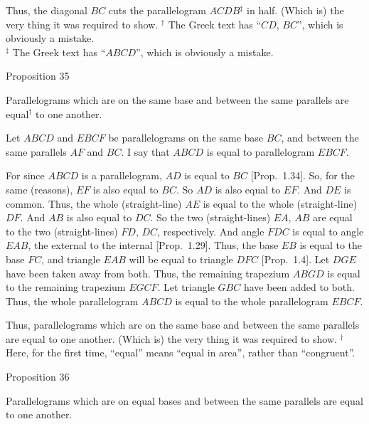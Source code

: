 Thus, the diagonal $BC$ cuts the parallelogram $ACDB$$^\ddag$ in half. (Which is) the
very thing it was required to show.
{\footnotesize \noindent$^\dag$ The Greek text has ``$CD$, $BC$'',
which is obviously a mistake.\\
$^\ddag$ The Greek
text has ``$ABCD$'', which is obviously a mistake.}


\begin{center}
{\large Proposition 35}
\end{center}

Parallelograms which are on the same base and between the same
parallels are equal$^\dag$ to one another.

\epsfysize=1.5in
\centerline{}

Let $ABCD$ and $EBCF$ be parallelograms on the same base $BC$, and
between the same parallels $AF$ and $BC$. I say that $ABCD$ is equal to
parallelogram $EBCF$.

For since $ABCD$ is a parallelogram, $AD$ is equal to $BC$ [Prop.~1.34].
So, for the same (reasons), $EF$ is also equal to $BC$. So $AD$ is also equal to
$EF$. And $DE$ is common. Thus, the whole (straight-line) $AE$ is equal
to the whole (straight-line) $DF$.  And $AB$ is also equal to $DC$.
So the two (straight-lines) $EA$, $AB$
are equal to the two (straight-lines) $FD$, $DC$, respectively. And angle $FDC$ is
equal to angle $EAB$, the external to the internal [Prop.~1.29]. Thus, the
base $EB$ is equal to the base $FC$, and triangle $EAB$ will be equal to triangle
$DFC$ [Prop.~1.4]. Let $DGE$ have been taken away from both. 
Thus, the remaining trapezium $ABGD$ is equal to the remaining trapezium
$EGCF$. Let triangle $GBC$ have been added to both. Thus, the whole
parallelogram $ABCD$ is equal to the whole parallelogram $EBCF$.

Thus, parallelograms which are on the same base and between the same
parallels are equal to one another. (Which is) the very thing it was required to
show.
{\footnotesize \noindent$^\dag$ Here, for the first time, ``equal'' means
``equal in area'', rather than ``congruent''.}


\begin{center}
{\large Proposition 36}
\end{center}

Parallelograms which are on equal bases and between the same parallels are equal to one another.

